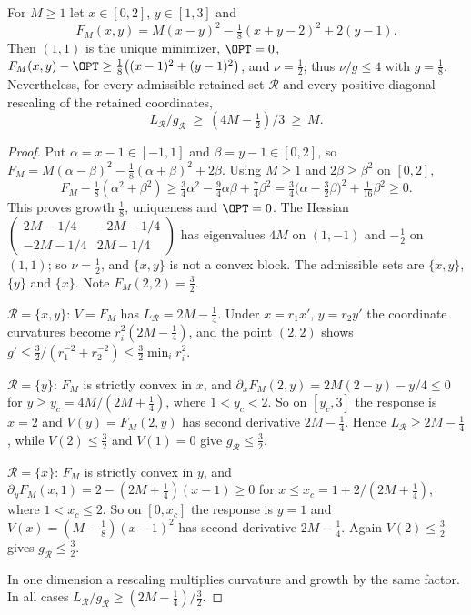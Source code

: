 \begin{proposition}\label{prop:cv-limit}
For $M\ge1$ let $x\in[0,2]$, $y\in[1,3]$ and
\[
F_M(x,y)=M(x-y)^2-\tfrac18(x+y-2)^2+2(y-1).
\]
Then $(1,1)$ is the unique minimizer, $\OPT=0$,
$F_M(x,y)-\OPT\ge\frac18\bigl((x-1)^2+(y-1)^2\bigr)$, and $\nu=\frac12$; thus
$\nu/g\le4$ with $g=\frac18$. Nevertheless, for every
admissible retained set $\mathcal R$ and every positive diagonal rescaling of
the retained coordinates,
\[
L_{\mathcal R}/g_{\mathcal R}\ \ge\ (4M-\tfrac12)/3\ \ge\ M.
\]
\end{proposition}

\begin{proof}
Put $\alpha=x-1\in[-1,1]$ and $\beta=y-1\in[0,2]$, so
$F_M=M(\alpha-\beta)^2-\frac18(\alpha+\beta)^2+2\beta$. Using $M\ge1$ and
$2\beta\ge\beta^2$ on $[0,2]$,
\[
F_M-\tfrac18(\alpha^2+\beta^2)\ge\tfrac34\alpha^2-\tfrac94\alpha\beta+\tfrac74\beta^2
=\tfrac34\bigl(\alpha-\tfrac32\beta\bigr)^2+\tfrac1{16}\beta^2\ge0.
\]
This proves growth $\frac18$, uniqueness and $\OPT=0$. The Hessian
$\left(\begin{smallmatrix}2M-1/4&-2M-1/4\\-2M-1/4&2M-1/4\end{smallmatrix}\right)$
has eigenvalues $4M$ on $(1,-1)$ and $-\frac12$ on $(1,1)$; so $\nu=\frac12$,
and $\{x,y\}$ is not a convex block. The admissible sets are $\{x,y\}$,
$\{y\}$ and $\{x\}$. Note $F_M(2,2)=\frac32$.

$\mathcal R=\{x,y\}$: $V=F_M$ has $L_{\mathcal R}=2M-\frac14$. Under
$x=r_1x'$, $y=r_2y'$ the coordinate curvatures become $r_i^2(2M-\frac14)$, and
the point $(2,2)$ shows $g'\le\frac32/(r_1^{-2}+r_2^{-2})\le\frac32\min_ir_i^2$.

$\mathcal R=\{y\}$: $F_M$ is strictly convex in $x$, and
$\partial_xF_M(2,y)=2M(2-y)-y/4\le0$ for $y\ge y_c=4M/(2M+\frac14)$, where
$1<y_c<2$. So on $[y_c,3]$ the response is $x=2$ and
$V(y)=F_M(2,y)$ has second derivative $2M-\frac14$. Hence
$L_{\mathcal R}\ge2M-\frac14$, while $V(2)\le\frac32$ and $V(1)=0$ give
$g_{\mathcal R}\le\frac32$.

$\mathcal R=\{x\}$: $F_M$ is strictly convex in $y$, and
$\partial_yF_M(x,1)=2-(2M+\frac14)(x-1)\ge0$ for
$x\le x_c=1+2/(2M+\frac14)$, where $1<x_c\le2$. So on $[0,x_c]$ the response
is $y=1$ and $V(x)=(M-\frac18)(x-1)^2$ has second derivative $2M-\frac14$.
Again $V(2)\le\frac32$ gives $g_{\mathcal R}\le\frac32$.

In one dimension a rescaling multiplies curvature and growth by the same
factor. In all cases $L_{\mathcal R}/g_{\mathcal R}\ge(2M-\frac14)/\frac32$.
\end{proof}

